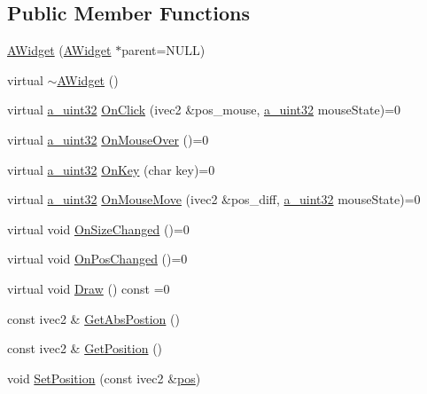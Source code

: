 \subsection*{Public Member Functions}
\begin{DoxyCompactItemize}
\item 
\hyperlink{class_agmd_1_1_a_widget_af5c89814154d8c6813e4c71c7e55dcdf}{A\+Widget} (\hyperlink{class_agmd_1_1_a_widget}{A\+Widget} $\ast$parent=N\+U\+L\+L)
\item 
virtual \hyperlink{class_agmd_1_1_a_widget_accb865d2155a95350af02c15070421a1}{$\sim$\+A\+Widget} ()
\item 
virtual \hyperlink{_common_defines_8h_a964296f9770051b9e4807b1f180dd416}{a\+\_\+uint32} \hyperlink{class_agmd_1_1_a_widget_aff1c3f1dad51042de699456c2a33e84f}{On\+Click} (ivec2 \&pos\+\_\+mouse, \hyperlink{_common_defines_8h_a964296f9770051b9e4807b1f180dd416}{a\+\_\+uint32} mouse\+State)=0
\item 
virtual \hyperlink{_common_defines_8h_a964296f9770051b9e4807b1f180dd416}{a\+\_\+uint32} \hyperlink{class_agmd_1_1_a_widget_a2504dbb651b6458a4733bde00cf029f4}{On\+Mouse\+Over} ()=0
\item 
virtual \hyperlink{_common_defines_8h_a964296f9770051b9e4807b1f180dd416}{a\+\_\+uint32} \hyperlink{class_agmd_1_1_a_widget_a7aa98bc35ca8af51b5d28f7d96c2cba6}{On\+Key} (char key)=0
\item 
virtual \hyperlink{_common_defines_8h_a964296f9770051b9e4807b1f180dd416}{a\+\_\+uint32} \hyperlink{class_agmd_1_1_a_widget_aa9b911c2d4f8506f80bdcfafb5373cc0}{On\+Mouse\+Move} (ivec2 \&pos\+\_\+diff, \hyperlink{_common_defines_8h_a964296f9770051b9e4807b1f180dd416}{a\+\_\+uint32} mouse\+State)=0
\item 
virtual void \hyperlink{class_agmd_1_1_a_widget_a65c040f47c294031a56ad4478e61654c}{On\+Size\+Changed} ()=0
\item 
virtual void \hyperlink{class_agmd_1_1_a_widget_a0ed53f97e67bcb7ed8db276d57c768d2}{On\+Pos\+Changed} ()=0
\item 
virtual void \hyperlink{class_agmd_1_1_a_widget_a310017991d4562418b3b4a1523778373}{Draw} () const =0
\item 
const ivec2 \& \hyperlink{class_agmd_1_1_a_widget_aab1c4fdeb55ed6d6695ca221199da5db}{Get\+Abs\+Postion} ()
\item 
const ivec2 \& \hyperlink{class_agmd_1_1_a_widget_abb92e4a1b58191f19a3cf70e0a997034}{Get\+Position} ()
\item 
void \hyperlink{class_agmd_1_1_a_widget_ad623409b81ce39302f804b81fc6f0c5b}{Set\+Position} (const ivec2 \&\hyperlink{_examples_2_planet_2_app_8cpp_aa8a1c0491559faca4ebd0881575ae7f0}{pos})

\end{DoxyCompactItemize}
